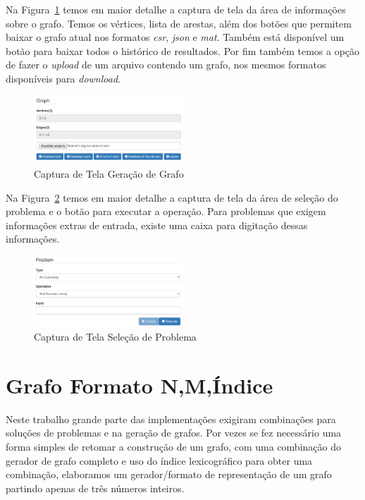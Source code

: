 Na Figura~\ref{fig-ferramenta-area-info-grafo} temos em maior detalhe a captura de tela da área de informações sobre o grafo.
Temos os vértices, lista de arestas, além dos botões que permitem baixar o grafo atual nos formatos \textit{csr}, \textit{json} e \textit{mat}.
Também está disponível um botão para baixar todos o histórico de resultados. 
Por fim também temos a opção de fazer o \textit{upload} de um arquivo contendo um grafo, nos mesmos formatos disponíveis para \textit{download}.

\begin{figure}[H]
\begin{center}
\includegraphics[width=0.5\textwidth]{./imagens/ferramenta-area-info-grafo.png}
\end{center}
\caption{Captura de Tela Geração de Grafo}
\label{fig-ferramenta-area-info-grafo}
\end{figure}


Na Figura~\ref{fig-ferramenta-area-problema} temos em maior detalhe 
a captura de tela da área de seleção do problema e o botão para executar a operação. Para problemas que exigem informações extras de entrada, 
existe uma caixa para digitação dessas informações.

\begin{figure}[H]
\begin{center}
\includegraphics[width=0.5\textwidth]{./imagens/ferramenta-area-problema.png}
\end{center}
\caption{Captura de Tela Seleção de Problema}
\label{fig-ferramenta-area-problema}
\end{figure}



\chapter{Grafo Formato N,M,Índice}
\label{apend-nm-indice}
Neste trabalho grande parte das implementações exigiram combinações para soluções de problemas
e na geração de grafos. Por vezes se fez necessário uma forma simples de retomar a construção de um grafo,
com uma combinação do gerador de grafo completo e uso do índice lexicográfico para obter uma combinação,
elaboramos um gerador/formato de representação de um grafo partindo apenas de três números inteiros.

